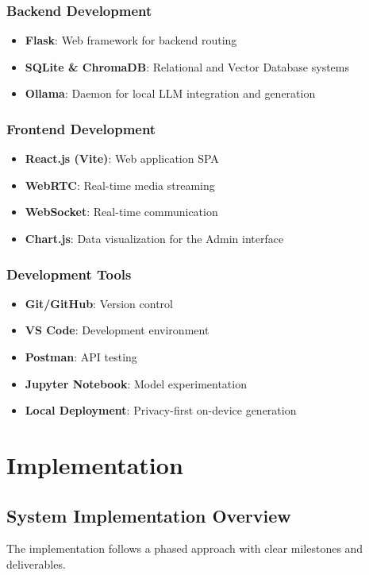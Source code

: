 \documentclass[11pt]{report}
\begin{document}
\subsection{Backend Development}
\begin{itemize}
    \item \textbf{Flask}: Web framework for backend routing
    \item \textbf{SQLite \& ChromaDB}: Relational and Vector Database systems
    \item \textbf{Ollama}: Daemon for local LLM integration and generation
\end{itemize}

\subsection{Frontend Development}
\begin{itemize}
    \item \textbf{React.js (Vite)}: Web application SPA
    \item \textbf{WebRTC}: Real-time media streaming
    \item \textbf{WebSocket}: Real-time communication
    \item \textbf{Chart.js}: Data visualization for the Admin interface
\end{itemize}

\subsection{Development Tools}
\begin{itemize}
    \item \textbf{Git/GitHub}: Version control
    \item \textbf{VS Code}: Development environment
    \item \textbf{Postman}: API testing
    \item \textbf{Jupyter Notebook}: Model experimentation
    \item \textbf{Local Deployment}: Privacy-first on-device generation
\end{itemize}

\chapter{Implementation}
\section{System Implementation Overview}
The implementation follows a phased approach with clear milestones and deliverables.
\end{document}
